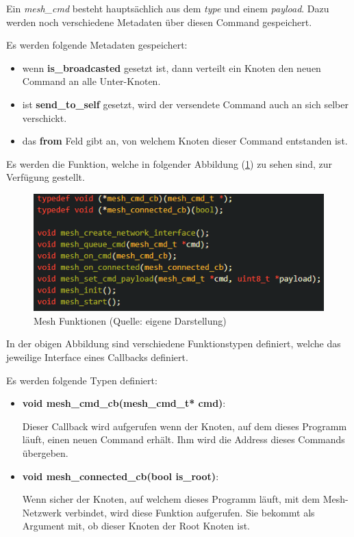 Ein \textit{mesh\_cmd} besteht hauptsächlich aus dem \textit{type} und einem \textit{payload}. Dazu werden noch verschiedene Metadaten über diesen Command gespeichert.

Es werden folgende Metadaten gespeichert:

\begin{itemize}
    \item wenn \textbf{is\_broadcasted} gesetzt ist, dann verteilt ein Knoten den neuen Command an alle Unter-Knoten. 
    \item ist \textbf{send\_to\_self} gesetzt, wird der versendete Command auch an sich selber verschickt.
    \item das \textbf{from} Feld gibt an, von welchem Knoten dieser Command entstanden ist.
\end{itemize}

Es werden die Funktion, welche in folgender Abbildung (\ref{abb:mesh_functions}) zu sehen sind, zur Verfügung gestellt.

\begin{figure}[H]
    \begin{center}
        \includegraphics[scale=1]{images/mesh_functions.png}
        \caption{Mesh Funktionen (Quelle: eigene Darstellung)}
        \label{abb:mesh_functions}
    \end{center}
\end{figure}

In der obigen Abbildung sind verschiedene Funktionstypen definiert, welche das jeweilige Interface eines Callbacks definiert.

Es werden folgende Typen definiert:

\begin{itemize}
    \item \textbf{void mesh\_cmd\_cb(mesh\_cmd\_t* cmd)}:

    Dieser Callback wird aufgerufen wenn der Knoten, auf dem dieses Programm läuft, einen neuen Command erhält. Ihm wird die Address dieses Commands übergeben.

    \item \textbf{void mesh\_connected\_cb(bool is\_root)}:
    
    Wenn sicher der Knoten, auf welchem dieses Programm läuft, mit dem Mesh-Netzwerk verbindet, wird diese Funktion aufgerufen. Sie bekommt als Argument mit, ob dieser Knoten der Root Knoten ist.
\end{itemize}

